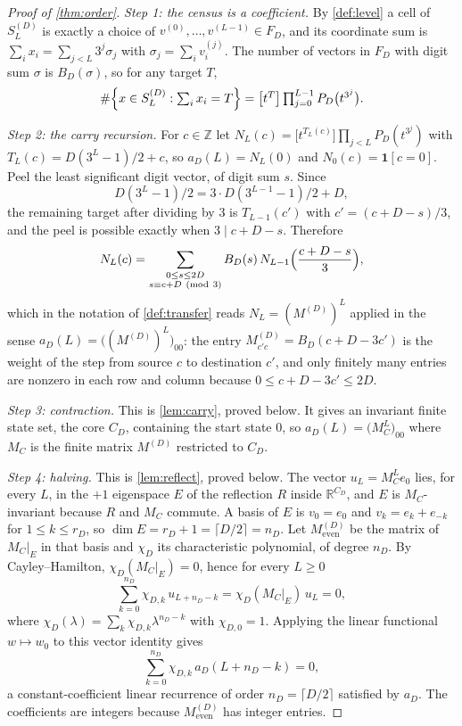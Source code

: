 \documentclass[11pt]{amsart}
\theoremstyle{definition}
\theoremstyle{remark}
\begin{document}
\begin{proof}[Proof of \cref{thm:order}]
\emph{Step 1: the census is a coefficient.} By \cref{def:level} a cell of $S_L^{(D)}$ is exactly a choice of $v^{(0)},\dots,v^{(L-1)} \in F_D$, and its coordinate sum is $\sum_i x_i = \sum_{j<L} 3^j \sigma_j$ with $\sigma_j = \sum_i v^{(j)}_i$. The number of vectors in $F_D$ with digit sum $\sigma$ is $B_D(\sigma)$, so for any target $T$,
\[
\#\Bigl\{ x \in S_L^{(D)} : \textstyle\sum_i x_i = T \Bigr\} = \bigl[t^T\bigr] \prod_{j=0}^{L-1} P_D\bigl(t^{3^j}\bigr).
\]

\emph{Step 2: the carry recursion.} For $c \in \mathbb{Z}$ let $N_L(c) = \bigl[t^{T_L(c)}\bigr]\prod_{j<L} P_D(t^{3^j})$ with $T_L(c) = D(3^L-1)/2 + c$, so $a_D(L) = N_L(0)$ and $N_0(c) = \mathbf{1}[c = 0]$. Peel the least significant digit vector, of digit sum $s$. Since
\[
D(3^L-1)/2 = 3 \cdot D(3^{L-1}-1)/2 + D,
\]
the remaining target after dividing by $3$ is $T_{L-1}(c')$ with $c' = (c+D-s)/3$, and the peel is possible exactly when $3 \mid c+D-s$. Therefore
\[
N_L(c) = \sum_{\substack{0 \le s \le 2D \\ s \equiv c+D \ (\mathrm{mod}\ 3)}} B_D(s)\, N_{L-1}\Bigl(\frac{c+D-s}{3}\Bigr),
\]
which in the notation of \cref{def:transfer} reads $N_L = (M^{(D)})^L$ applied in the sense $a_D(L) = \bigl((M^{(D)})^L\bigr)_{00}$: the entry $M^{(D)}_{c'c} = B_D(c+D-3c')$ is the weight of the step from source $c$ to destination $c'$, and only finitely many entries are nonzero in each row and column because $0 \le c+D-3c' \le 2D$.

\emph{Step 3: contraction.} This is \cref{lem:carry}, proved below. It gives an invariant finite state set, the core $C_D$, containing the start state $0$, so $a_D(L) = \bigl(M_C^L\bigr)_{00}$ where $M_C$ is the finite matrix $M^{(D)}$ restricted to $C_D$.

\emph{Step 4: halving.} This is \cref{lem:reflect}, proved below. The vector $u_L = M_C^L e_0$ lies, for every $L$, in the $+1$ eigenspace $E$ of the reflection $R$ inside $\mathbb{R}^{C_D}$, and $E$ is $M_C$-invariant because $R$ and $M_C$ commute. A basis of $E$ is $v_0 = e_0$ and $v_k = e_k + e_{-k}$ for $1 \le k \le r_D$, so $\dim E = r_D + 1 = \lceil D/2 \rceil = n_D$. Let $M_{\mathrm{even}}^{(D)}$ be the matrix of $M_C|_E$ in that basis and $\chi_D$ its characteristic polynomial, of degree $n_D$. By Cayley--Hamilton, $\chi_D(M_C|_E) = 0$, hence for every $L \ge 0$
\[
\sum_{k=0}^{n_D} \chi_{D,k}\, u_{L+n_D-k} = \chi_D(M_C|_E)\, u_L = 0,
\]
where $\chi_D(\lambda) = \sum_k \chi_{D,k}\lambda^{n_D-k}$ with $\chi_{D,0} = 1$. Applying the linear functional $w \mapsto w_0$ to this vector identity gives
\[
\sum_{k=0}^{n_D} \chi_{D,k}\, a_D(L+n_D-k) = 0 ,
\]
a constant-coefficient linear recurrence of order $n_D = \lceil D/2 \rceil$ satisfied by $a_D$. The coefficients are integers because $M_{\mathrm{even}}^{(D)}$ has integer entries.
\end{proof}
\end{document}
